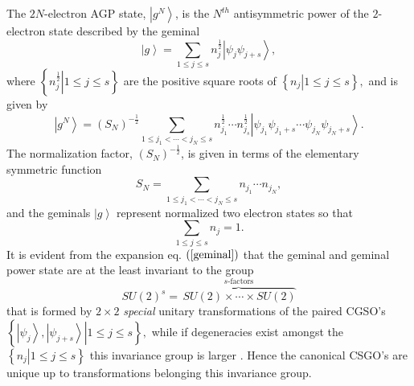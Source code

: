 \documentclass[aps,preprint]{revtex4}%
\begin{document}
The $2N$-electron AGP state, $\left\vert g^{N}\right\rangle $, is the $N^{th}$
antisymmetric power of the $2$-electron state described by the geminal
\begin{equation}
\left\vert g\right\rangle =\sum_{1\leq j\leq s}n_{j}^{\frac{1}{2}}\left\vert
\psi_{j}\psi_{j+s}\right\rangle , \label{geminal}%
\end{equation}
where $\left\{  \left.  n_{j}^{\frac{1}{2}}\right\vert 1\leq j\leq s\right\}
$ are the positive square roots of $\left\{  \left.  n_{j}\right\vert 1\leq
j\leq s\right\}  ,$ and is given by \cite{weiner&ortiz2004}
\begin{equation}
\left\vert g^{N}\right\rangle =\left(  S_{N}\right)  ^{-\frac{1}{2}}%
\sum_{1\leq j_{1}<\cdots<j_{N}\leq s}n_{j_{1}}^{\frac{1}{2}}\cdots n_{j_{s}%
}^{\frac{1}{2}}\left\vert \psi_{j_{1}}\psi_{j_{1}+s}\cdots\psi_{j_{N}}%
\psi_{j_{N}+s}\right\rangle . \label{agp}%
\end{equation}
The normalization factor, $\left(  S_{N}\right)  ^{-\frac{1}{2}}$, is given in
terms of the elementary symmetric function
\begin{equation}
S_{N}=\sum_{1\leq j_{1}<\cdots<j_{N}\leq s}n_{j_{1}}\cdots n_{j_{N}},
\end{equation}
and the geminals $\left\vert g\right\rangle $ represent normalized two
electron states so that
\begin{equation}
\sum_{1\leq j\leq s}n_{j}=1.
\end{equation}
It is evident from the expansion eq. $\left(  \ref{geminal}\right)  $ that the
geminal and geminal power state are at the least invariant to the group
\begin{equation}
SU\left(  2\right)  ^{s}=\overset{s\text{-factors}}{\overbrace{\,SU\left(
2\right)  \times\cdots\times SU\left(  2\right)  }}%
\end{equation}
that is formed by $2\times2$ \emph{special} unitary transformations of the
paired CGSO's $\left\{  \left.  \left\vert \psi_{j}\right\rangle ,\left\vert
\psi_{j+s}\right\rangle \right\vert 1\leq j\leq s\right\}  ,$ while if
degeneracies exist amongst the $\left\{  \left.  n_{j}\right\vert 1\leq j\leq
s\right\}  $ this invariance group is larger \cite{Weiner2004}. Hence the
canonical CSGO's are unique up to transformations belonging this invariance group.
\end{document}
